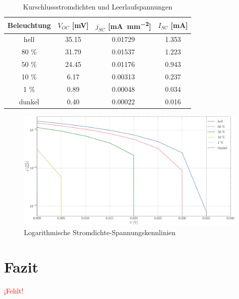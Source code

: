 \documentclass[12pt,a4paper,ngerman]{report}
\providecommand{\fehlt}{\textcolor{red}{{ ¡Fehlt! }}}
\begin{document}
\begin{table}[h!]
	\centering
	\begin{tabular}{c c c c}
		\toprule[1.5pt]
		Beleuchtung & $V_{OC}$ [\si{\milli \volt}] & $j_{SC}$ [\si{\milli \ampere \per \milli \meter \squared}] & $I_{SC}$ [\si{\milli \ampere}] \\
		\midrule
		hell        & 35.15  &  0.01729  & 1.353      \\
		80 \%       & 31.79  &  0.01537  & 1.223            \\
		50 \%       & 24.45  &  0.01176  & 0.943            \\
		10 \%       & 6.17   &  0.00313  & 0.237          \\
		1  \%       & 0.89   &  0.00048  & 0.034          \\
		dunkel      & 0.40   &  0.00022  & 0.016          \\
		\bottomrule[1.5pt]
	\end{tabular}
	\caption{Kurschlussstromdichten und Leerlaufspannungen}\label{table:KurzschlussLeerlauf}
\end{table}
\begin{figure} 
	\centering
	\includegraphics[width=\textwidth]{Bilder/KennlinienLOG.pdf}
	\caption{Logarithmische Stromdichte-Spannungskennlinien}
	\label{img:KennlinienLOG}
\end{figure}
\chapter{Fazit}
	\fehlt

\listoffigures%
	
\end{document}
